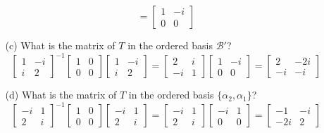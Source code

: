 \documentclass{article}
\begin{document}
\begin{enumerate}[listparindent=\parindent]
\begin{enumerate}[listparindent=\parindent]
\[                =
                \begin{bmatrix} 1 & -i \\ 0 & 0 \end{bmatrix}
            \]
        \item[(c)] What is the matrix of \(T\) in the ordered basis \(\mathcal{B}'\)?
            \[
                \begin{bmatrix} 1 & -i \\ i & 2 \end{bmatrix}^{-1}
                \begin{bmatrix} 1 & 0 \\ 0 & 0 \end{bmatrix}
                \begin{bmatrix} 1 & -i \\ i & 2 \end{bmatrix}
                =
                \begin{bmatrix} 2 & i \\ -i & 1 \end{bmatrix}
                \begin{bmatrix} 1 & -i \\ 0 & 0 \end{bmatrix}
                =
                \begin{bmatrix} 2 & -2i \\-i & -i \end{bmatrix}
            \]
        \item[(d)] What is the matrix of \(T\) in the ordered basis \(\{\alpha_2, \alpha_1\}\)?
            \[
                \begin{bmatrix} -i & 1 \\ 2 & i \end{bmatrix}^{-1}
                \begin{bmatrix} 1 & 0 \\ 0 & 0 \end{bmatrix}
                \begin{bmatrix} -i & 1 \\ 2 & i \end{bmatrix}
                =
                \begin{bmatrix} -i & 1 \\ 2 & i \end{bmatrix}
                \begin{bmatrix} -i & 1 \\ 0 & 0 \end{bmatrix}
                =
                \begin{bmatrix} -1 & -i \\ -2i & 2 \end{bmatrix}
            \]
    \end{enumerate}


\end{enumerate}
\end{document}
